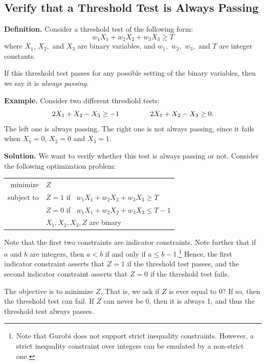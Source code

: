 \documentclass[]{article}
\begin{document}

\subsection*{Verify that a Threshold Test is Always Passing}

\textbf{Definition.} Consider a threshold test of the following form:
\[
w_1 X_1 + w_2 X_2 + w_3 X_3 \ge T
\]
where \(X_1\), \(X_2,\) and \(X_3\) are binary variables, and \(w_1,\) \(w_2,\) \(w_3,\) and \(T\) are integer constants.

If this threshold test passes for any possible setting of the binary variables, then we say it is \emph{always passing}.

\textbf{Example.} Consider two different threshold tests:
\[
2 X_1 + X_2 - X_3 \ge -1
\mbox{ \quad\quad\quad\quad }
2 X_1 + X_2 - X_3 \ge 0.
\]
The left one is always passing.  The right one is not always passing, since it fails when \(X_1=0\), \(X_2=0\) and \(X_3=1\).

\textbf{Solution.}  We want to verify whether this test is always passing or not.  Consider the following optimization problem:
\begin{center}
\begin{tabular}{rl}
minimize   & \(Z\) \\
subject to & 
  $Z = 1$ \mbox{\quad if \quad} $w_1 X_1 + w_2 X_2 + w_3 X_3 \ge T$ \\
& $Z = 0$ \mbox{\quad if \quad} $w_1 X_1 + w_2 X_2 + w_3 X_3 \le T-1$ \\
& $X_1,X_2,X_3,Z$ are binary
\end{tabular}
\end{center}
Note that the first two constraints are indicator constraints.  Note further that if \(a\) and \(b\) are integers, then \(a < b\) if and only if \(a \le b-1\).\footnote{Note that Gurobi does not support strict inequality constraints.  However, a strict inequality constraint over integers can be emulated by a non-strict one.}  Hence, the first indicator constraint asserts that \(Z=1\) if the threshold test passes, and the second indicator constraint asserts that \(Z=0\) if the threshold test fails.

The objective is to minimize $Z$.  That is, we ask if $Z$ is ever equal to 0?  If so, then the threshold test can fail.  If $Z$ can never be 0, then it is always 1, and thus the threshold test always passes.
\end{document}
